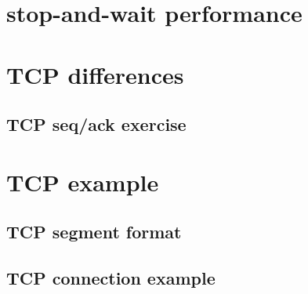 \section{stop-and-wait performance}




\section{TCP differences}


\subsection{TCP seq/ack exercise}


\section{TCP example}

\subsection{TCP segment format}


%

\subsection{TCP connection example}



